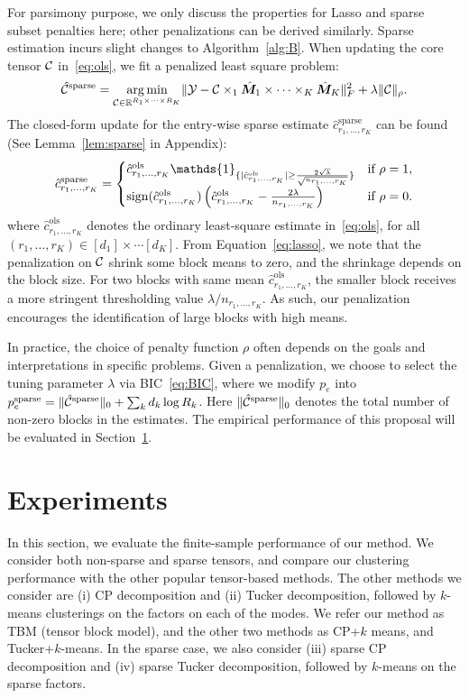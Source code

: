 \documentclass{article}
\begin{document}
For parsimony purpose, we only discuss the properties for Lasso and sparse subset penalties here; other penalizations can be derived similarly. Sparse estimation incurs slight changes to Algorithm~\ref{alg:B}. When updating the core tensor $\mathcal{C}$ in~\eqref{eq:ols}, we  fit a penalized least square problem:
\[
\hat {\mathcal{C}}^{\text{sparse}}=\operatorname*{arg\,min}_{\mathcal{C}\in\mathbb{R}^{R_1\times \cdots\times R_K}} \lVert\mathcal{Y}-\mathcal{C}\times_1\hat {\bm M}_1\times\cdots\times_K \hat {\bm M}_K\rVert_F^2+\lambda \lVert\mathcal{C}\rVert_\rho.
\]
The closed-form update for the entry-wise sparse estimate $\hat c^{\text{sparse}}_{r_1,\ldots,r_K}$ can be found (See Lemma~\ref{lem:sparse} in Appendix):
\begin{equation}\label{eq:lasso}
\hat c^{\text{sparse}}_{r_1,\ldots,r_K}=
\begin{cases}
\hat c^{\text{ols}}_{r_1,\ldots,r_K}\mathds{1}_{\{|\hat c^{\text{ols}}_{r_1,\ldots,r_K} |\geq {2\sqrt{\lambda} \over \sqrt{n_{r_1,\ldots,r_K}}}\}} & \text{if}\ \rho=1,\\
\text{sign}(\hat c^{\text{ols}}_{r_1,\ldots,r_K})\left( \hat c^{\text{ols}}_{r_1,\ldots,r_K}-{2\lambda \over n_{r_1,\ldots,r_K}}  \right) &\text{if}\ \rho=0.
\end{cases}
\end{equation}
where $\hat c^{\text{ols}}_{r_1,\ldots,r_K}$ denotes the ordinary least-square estimate in~\eqref{eq:ols}, for all $(r_1,\ldots,r_K)\in[d_1]\times\cdots[d_K]$. From Equation~\eqref{eq:lasso}, we note that the penalization on $\mathcal{C}$ shrink some block means to zero, and the shrinkage depends on the block size. For two blocks with same mean $\hat c^{\text{ols}}_{r_1,\ldots,r_K}$, the smaller block receives a more stringent thresholding value $\lambda/ n_{r_1,\ldots,r_K}$. As such, our penalization encourages the identification of large blocks with high means. 


In practice, the choice of penalty function $\rho$ often depends on the goals and interpretations in specific problems. Given a penalization, we choose to select the tuning parameter $\lambda$ via BIC~\eqref{eq:BIC}, where we modify $p_e$ into $p^{\text{sparse}}_e=\lVert\hat {\mathcal{C}}^{\text{sparse}}\rVert_0+\sum_kd_k\log R_k$. Here $\lVert\hat {\mathcal{C}}^{\text{sparse}}\rVert_0$ denotes the total number of non-zero blocks in the estimates. The empirical performance of this proposal will be evaluated in Section~\ref{sec:simulation}. 



\section{Experiments}\label{sec:simulation}
In this section, we evaluate the finite-sample performance of our method. We consider both non-sparse and sparse tensors, and compare our clustering performance with the other popular tensor-based methods. The other methods we consider are (i) CP decomposition and (ii) Tucker decomposition, followed by $k$-means clusterings on the factors on each of the modes. We refer our method as TBM (tensor block model), and the other two methods as CP+$k$ means, and Tucker+$k$-means. In the sparse case, we also consider (iii) sparse CP decomposition and (iv) sparse Tucker decomposition, followed by $k$-means on the sparse factors. 
\end{document}
